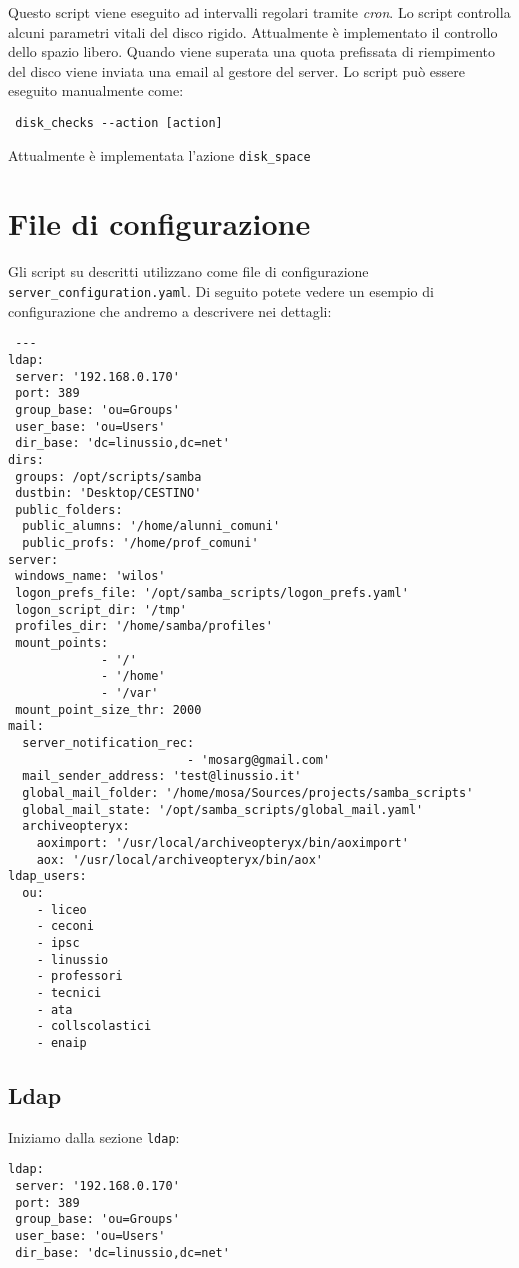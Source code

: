 \documentclass[a4paper,10pt,oneside]{memoir}
\begin{document}
Questo script viene eseguito ad intervalli regolari tramite \emph{cron}. Lo script controlla alcuni parametri vitali del disco rigido. Attualmente è implementato il controllo dello spazio libero. Quando viene superata una quota prefissata di riempimento del disco viene inviata una email al gestore del server. Lo script può essere eseguito manualmente come:
\begin{verbatim}
 disk_checks --action [action]
\end{verbatim}
Attualmente è implementata l'azione \verb#disk_space#

\section*{File di configurazione}

Gli script su descritti utilizzano come file di configurazione \verb#server_configuration.yaml#. Di seguito potete vedere un esempio di configurazione che andremo a descrivere nei dettagli:
\begin{verbatim}
 --- 
ldap:
 server: '192.168.0.170'
 port: 389
 group_base: 'ou=Groups'
 user_base: 'ou=Users'
 dir_base: 'dc=linussio,dc=net'  
dirs:
 groups: /opt/scripts/samba
 dustbin: 'Desktop/CESTINO' 
 public_folders:
  public_alumns: '/home/alunni_comuni'
  public_profs: '/home/prof_comuni'
server:
 windows_name: 'wilos'
 logon_prefs_file: '/opt/samba_scripts/logon_prefs.yaml'
 logon_script_dir: '/tmp'
 profiles_dir: '/home/samba/profiles'
 mount_points:
             - '/'
             - '/home'
             - '/var'
 mount_point_size_thr: 2000
mail:
  server_notification_rec:
                         - 'mosarg@gmail.com'
  mail_sender_address: 'test@linussio.it'
  global_mail_folder: '/home/mosa/Sources/projects/samba_scripts'
  global_mail_state: '/opt/samba_scripts/global_mail.yaml'
  archiveopteryx:
    aoximport: '/usr/local/archiveopteryx/bin/aoximport'
    aox: '/usr/local/archiveopteryx/bin/aox'
ldap_users:
  ou:
    - liceo
    - ceconi
    - ipsc
    - linussio
    - professori
    - tecnici
    - ata
    - collscolastici
    - enaip
\end{verbatim}

\subsection*{Ldap}
Iniziamo dalla sezione \verb#ldap#:
\begin{verbatim}
ldap:
 server: '192.168.0.170'
 port: 389
 group_base: 'ou=Groups'
 user_base: 'ou=Users'
 dir_base: 'dc=linussio,dc=net'  
\end{verbatim}
\end{document}
